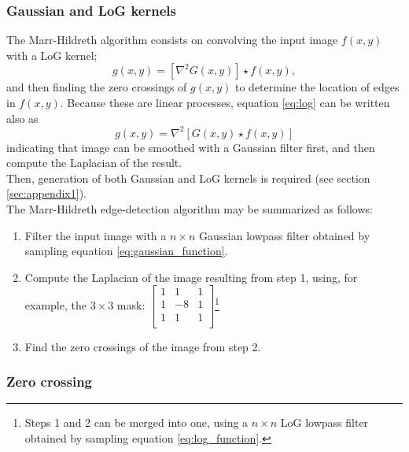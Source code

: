 \documentclass{ipol}
\numberwithin{equation}{section}
\numberwithin{table}{section}
\numberwithin{figure}{section}
\begin{document}

\subsubsection{Gaussian and LoG kernels}

The Marr-Hildreth algorithm consists on convolving the input image $f(x,y)$ with a LoG kernel;
\begin{equation}\label{eq:log}
  g(x,y) = [\nabla^2G(x,y)]\star f(x,y), 
\end{equation}
and then finding the zero crossings of $g(x,y)$ to determine the location of edges in $f(x,y)$. 
Because these are linear processes, equation \ref{eq:log} can be written also as
\begin{equation}
  g(x,y) = \nabla^2[G(x,y)\star f(x,y)]
\end{equation}
indicating that image can be smoothed with a Gaussian filter first, and then compute the Laplacian of the result.\\

Then, generation of both Gaussian and LoG kernels is required (see section \ref{sec:appendix1}).\\

The Marr-Hildreth edge-detection algorithm may be summarized as follows:
\begin{enumerate}
	\item Filter the input image with a $n \times n$ Gaussian lowpass filter obtained by sampling equation \ref{eq:gaussian_function}.
	\item Compute the Laplacian of the image resulting from step 1, using, for example, the $3\times3$ mask:
			$\begin{bmatrix}
			1 &  1 & 1 \\
			1 & -8 & 1 \\
			1 &  1 & 1 \\
			\end{bmatrix}$\footnote{Steps 1 and 2 can be merged into one, using a $n\times n$ LoG lowpass filter obtained by sampling equation \ref{eq:log_function}.}
	\item Find the zero crossings of the image from step 2.
\end{enumerate}


\subsubsection{Zero crossing}
\end{document}

